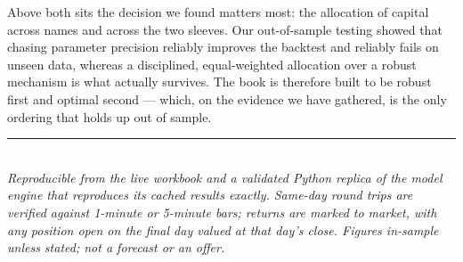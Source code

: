 \documentclass[11pt]{article}
\begin{document}
Above both sits the decision we found matters most: the allocation of capital across names and
across the two sleeves. Our out-of-sample testing showed that chasing parameter precision
reliably improves the backtest and reliably fails on unseen data, whereas a disciplined,
equal-weighted allocation over a robust mechanism is what actually survives. The book is
therefore built to be robust first and optimal second --- which, on the evidence we have
gathered, is the only ordering that holds up out of sample.

\vfill
{\color{bcrule}\rule{\textwidth}{0.5pt}}\\[0.2em]
{\footnotesize\itshape\color{bcgrey} Reproducible from the live workbook and a validated Python
replica of the model engine that reproduces its cached results exactly. Same-day round trips are
verified against 1-minute or 5-minute bars; returns are marked to market, with any position open
on the final day valued at that day's close. Figures in-sample unless stated; not a forecast or
an offer.}
\end{document}
